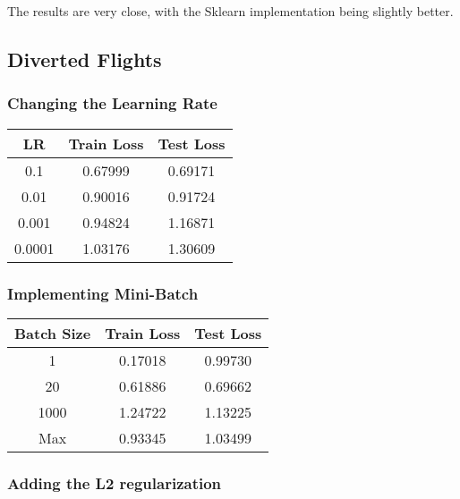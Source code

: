 \documentclass[
	letterpaper, %
	10pt, %
]{class}
\begin{document}
The results are very close, with the Sklearn implementation being slightly better.

\subsection{Diverted Flights}

\subsubsection{Changing the Learning Rate}

\begin{center}
	\begin{tabular}{ |c|c|c| }
		\hline
		LR     & Train Loss & Test Loss \\
		\hline
		0.1    & 0.67999    & 0.69171   \\
		0.01   & 0.90016    & 0.91724   \\
		0.001  & 0.94824    & 1.16871   \\
		0.0001 & 1.03176    & 1.30609   \\
		\hline
	\end{tabular}
\end{center}

\subsubsection{Implementing Mini-Batch}

\begin{center}
	\begin{tabular}{ |c|c|c| }
		\hline
		Batch Size & Train Loss & Test Loss \\
		\hline
		1          & 0.17018    & 0.99730   \\
		20         & 0.61886    & 0.69662   \\
		1000       & 1.24722    & 1.13225   \\
		Max        & 0.93345    & 1.03499   \\
		\hline
	\end{tabular}
\end{center}

\subsubsection{Adding the L2 regularization}
\end{document}
